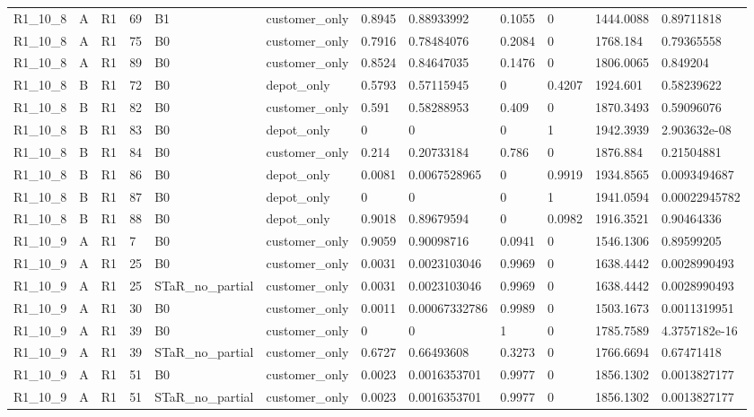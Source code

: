 \begin{longtable}{llllllllllll}
R1\_10\_8 & A & R1 & 69 & B1 & customer\_only & 0.8945 & 0.88933992 & 0.1055 & 0 & 1444.0088 & 0.89711818 \\
R1\_10\_8 & A & R1 & 75 & B0 & customer\_only & 0.7916 & 0.78484076 & 0.2084 & 0 & 1768.184 & 0.79365558 \\
R1\_10\_8 & A & R1 & 89 & B0 & customer\_only & 0.8524 & 0.84647035 & 0.1476 & 0 & 1806.0065 & 0.849204 \\
R1\_10\_8 & B & R1 & 72 & B0 & depot\_only & 0.5793 & 0.57115945 & 0 & 0.4207 & 1924.601 & 0.58239622 \\
R1\_10\_8 & B & R1 & 82 & B0 & customer\_only & 0.591 & 0.58288953 & 0.409 & 0 & 1870.3493 & 0.59096076 \\
R1\_10\_8 & B & R1 & 83 & B0 & depot\_only & 0 & 0 & 0 & 1 & 1942.3939 & 2.903632e-08 \\
R1\_10\_8 & B & R1 & 84 & B0 & customer\_only & 0.214 & 0.20733184 & 0.786 & 0 & 1876.884 & 0.21504881 \\
R1\_10\_8 & B & R1 & 86 & B0 & depot\_only & 0.0081 & 0.0067528965 & 0 & 0.9919 & 1934.8565 & 0.0093494687 \\
R1\_10\_8 & B & R1 & 87 & B0 & depot\_only & 0 & 0 & 0 & 1 & 1941.0594 & 0.00022945782 \\
R1\_10\_8 & B & R1 & 88 & B0 & depot\_only & 0.9018 & 0.89679594 & 0 & 0.0982 & 1916.3521 & 0.90464336 \\
R1\_10\_9 & A & R1 & 7 & B0 & customer\_only & 0.9059 & 0.90098716 & 0.0941 & 0 & 1546.1306 & 0.89599205 \\
R1\_10\_9 & A & R1 & 25 & B0 & customer\_only & 0.0031 & 0.0023103046 & 0.9969 & 0 & 1638.4442 & 0.0028990493 \\
R1\_10\_9 & A & R1 & 25 & STaR\_no\_partial & customer\_only & 0.0031 & 0.0023103046 & 0.9969 & 0 & 1638.4442 & 0.0028990493 \\
R1\_10\_9 & A & R1 & 30 & B0 & customer\_only & 0.0011 & 0.00067332786 & 0.9989 & 0 & 1503.1673 & 0.0011319951 \\
R1\_10\_9 & A & R1 & 39 & B0 & customer\_only & 0 & 0 & 1 & 0 & 1785.7589 & 4.3757182e-16 \\
R1\_10\_9 & A & R1 & 39 & STaR\_no\_partial & customer\_only & 0.6727 & 0.66493608 & 0.3273 & 0 & 1766.6694 & 0.67471418 \\
R1\_10\_9 & A & R1 & 51 & B0 & customer\_only & 0.0023 & 0.0016353701 & 0.9977 & 0 & 1856.1302 & 0.0013827177 \\
R1\_10\_9 & A & R1 & 51 & STaR\_no\_partial & customer\_only & 0.0023 & 0.0016353701 & 0.9977 & 0 & 1856.1302 & 0.0013827177 \\

\end{longtable}
